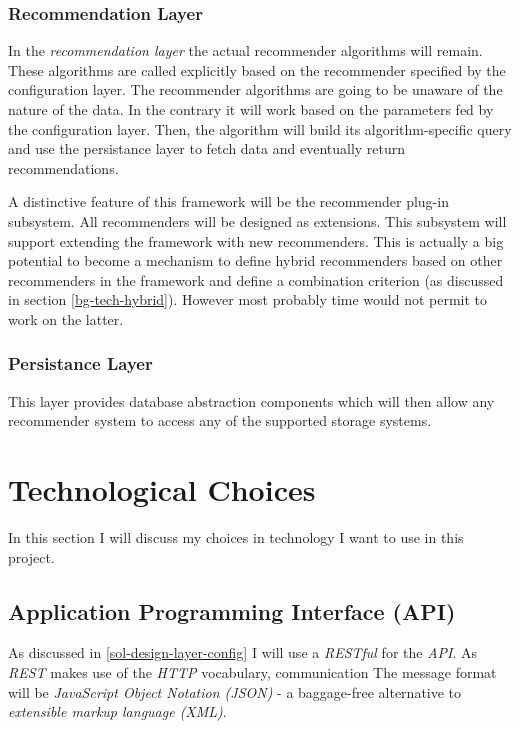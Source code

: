 \subsubsection{Recommendation Layer}
\label{sol-design-layer-reco}

In the \emph{recommendation layer} the actual recommender algorithms will remain. These algorithms are called explicitly based on the recommender specified by the configuration layer. The recommender algorithms are going to be unaware of the nature of the data. In the contrary it will work based on the parameters fed by the configuration layer. Then, the algorithm will build its algorithm-specific query and use the persistance layer to fetch data and eventually return recommendations.

A distinctive feature of this framework will be the recommender plug-in subsystem. All recommenders will be designed as extensions. This subsystem will support extending the framework with new recommenders. This is actually a big potential to become a mechanism to define hybrid recommenders based on other recommenders in the framework and define a combination criterion (as discussed in section \ref{bg-tech-hybrid}). However most probably time would not permit to work on the latter.

\subsubsection{Persistance Layer}

This layer provides database abstraction components which will then allow any recommender system to access any of the supported storage systems.



\section{Technological Choices}

In this section I will discuss my choices in technology I want to use in this project.

\subsection{Application Programming Interface (API)}

As discussed in \ref{sol-design-layer-config} I will use a \emph{RESTful} for the \emph{API}. As \emph{REST} makes use of the \emph{HTTP} vocabulary, communication  The message format will be \emph{JavaScript Object Notation (JSON)} - a baggage-free alternative to \emph{extensible markup language (XML)}.



